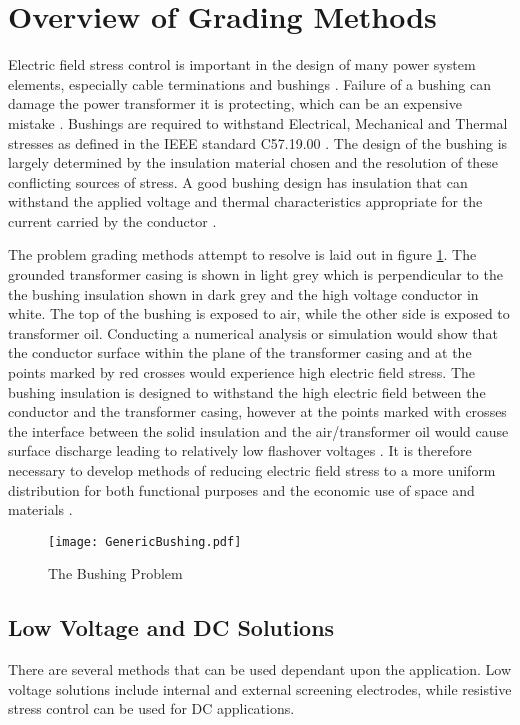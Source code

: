 \section{Overview of Grading Methods} 
Electric field stress control is important in the design of many power system elements, especially cable terminations and bushings \cite{james2008condition}.
Failure of a bushing can damage the power transformer it is protecting, which can be an expensive mistake \cite{warne2005newnes}.
Bushings are required to withstand Electrical, Mechanical and Thermal stresses as defined in the IEEE standard C57.19.00 \cite{1440990}.
The design of the bushing is largely determined by the insulation material chosen and the resolution of these conflicting sources of stress.
A good bushing design has insulation that can withstand the applied voltage and thermal characteristics appropriate for the current carried by the conductor \cite{harlow2004electric}.

The problem grading methods attempt to resolve is laid out in figure \ref{figure:problem}.
The grounded transformer casing is shown in light grey which is perpendicular to the the bushing insulation shown in dark grey and the high voltage conductor in white.
The top of the bushing is exposed to air, while the other side is exposed to transformer oil.
Conducting a numerical analysis or simulation would show that the conductor surface within the plane of the transformer casing and at the points marked by red crosses would experience high electric field stress.
The bushing insulation is designed to withstand the high electric field between the conductor and the transformer casing, however at the points marked with crosses the interface between the solid insulation and the air/transformer oil would cause surface discharge leading to relatively low flashover voltages \cite{kuffel2000high}.
It is therefore necessary to develop methods of reducing electric field stress to a more uniform distribution for both functional purposes and the economic use of space and materials \cite{james2008condition}.

\begin{figure}[!h]
   \centering
   \texttt{[image: GenericBushing.pdf]}
   \caption{The Bushing Problem}
   \label{figure:problem}
\end{figure}

\subsection{Low Voltage and DC Solutions}
There are several methods that can be used dependant upon the application.
Low voltage solutions include internal and external screening electrodes, while resistive stress control can be used for DC applications.

